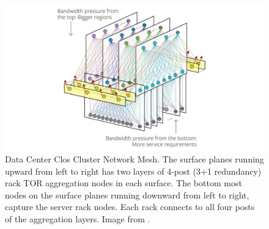 \begin{figure} [!h]
\centering
\includegraphics[scale=6]{methodology/images/fb_clos.jpg}
\caption[DC Clos Network]{Data Center Clos Cluster Network Mesh. The surface planes running upward from left to right has two layers of 4-post (3+1 redundancy) rack TOR aggregation nodes in each surface. The bottom most nodes on the surface planes running downward from left to right, capture the server rack nodes. Each rack connects to all four posts of the aggregation layers.  Image from  \cite{fb_clos}.}
\label{img_fb_clos}
\end{figure}